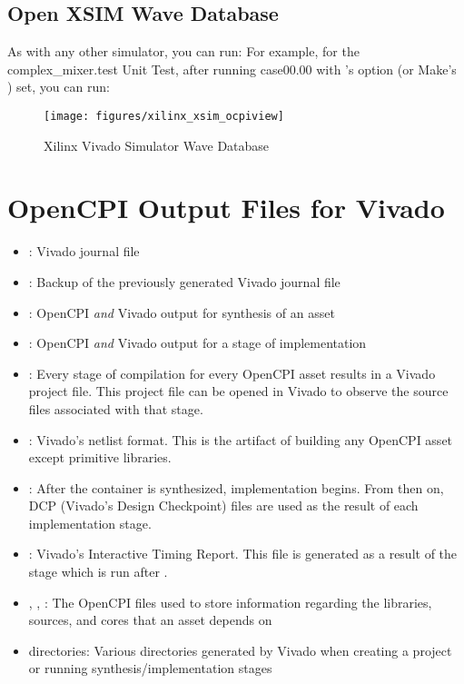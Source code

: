 \begin{flushleft}
\subsection{Open XSIM Wave Database}
As with any other simulator, you can run:\newline
{}\newline
For example, for the complex\_mixer.test Unit Test, after running case00.00 with 's  option (or Make's ) set, you can run:\newline
{}
\begin{figure}[H]
	\centerline{\texttt{[image: figures/xilinx\_xsim\_ocpiview]}}
	\caption{Xilinx Vivado Simulator Wave Database}
\end{figure}


\section{OpenCPI Output Files for Vivado}
\begin{itemize}
\item {}: Vivado journal file
\item {}: Backup of the previously generated Vivado journal file
\item {}: OpenCPI \textit{and} Vivado output for synthesis of an asset
\item {}: OpenCPI \textit{and} Vivado output for a stage of implementation
\item {}: Every stage of compilation for every OpenCPI asset results in a Vivado project file. This project file can be opened in Vivado to observe the source files associated with that stage.
\item {}: Vivado's netlist format. This is the artifact of building any OpenCPI asset except primitive libraries.
\item {}: After the container is synthesized, implementation begins. From then on, DCP (Vivado's Design Checkpoint) files are used as the result of each implementation stage.
\item {}: Vivado's Interactive Timing Report. This file is generated as a result of the  stage which is run after .
\item {}, , : The OpenCPI files used to store information regarding the libraries, sources, and cores that an asset depends on
\item {} directories: Various directories generated by Vivado when creating a project or running synthesis/implementation stages
\end{itemize}

\end{flushleft}
